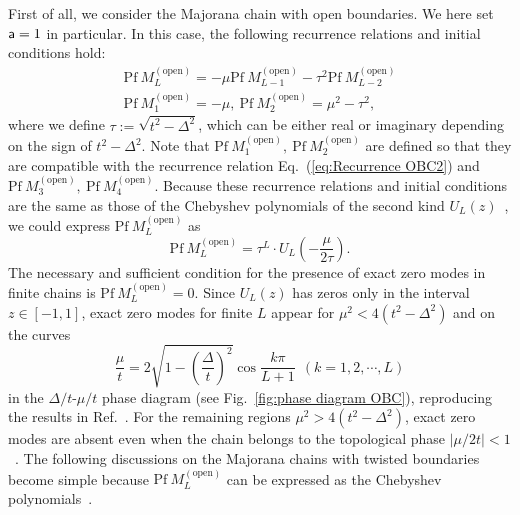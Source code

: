 \documentclass[aps, prb, showpacs, twocolumn, %
amssymb,superscriptaddress]{revtex4}
\begin{document}
First of all, we consider the Majorana chain with open boundaries. We here set ${\sf a}=1$ in particular. In this case, the following recurrence relations and initial conditions hold:
\begin{align}
\mathrm{Pf}~M_{L}^{\left( \mathrm{open} \right)} = -\mu \mathrm{Pf}~M_{L-1}^{\left( \mathrm{open} \right)} - \tau^{2} \mathrm{Pf}~M_{L-2}^{\left( \mathrm{open} \right)}
\label{eq:Recurrence OBC2} \\
\mathrm{Pf}~M_{1} ^{\left( \mathrm{open} \right)} = -\mu,~
\mathrm{Pf}~M_{2} ^{\left( \mathrm{open} \right)} = \mu^{2} - \tau^{2},
\end{align}
where we define $\tau := \sqrt{t^{2} - \Delta^{2}}$, which can be either real or imaginary depending on the sign of $t^2-\Delta^2$. Note that $\mathrm{Pf}~M_{1}^{\left( \mathrm{open} \right)},~\mathrm{Pf}~M_{2}^{\left( \mathrm{open} \right)}$ are defined so that they are compatible with the recurrence relation Eq.~(\ref{eq:Recurrence OBC2}) and $\mathrm{Pf}~M_{3}^{\left( \mathrm{open} \right)} ,~\mathrm{Pf}~M_{4}^{\left( \mathrm{open} \right)} $. 
Because these recurrence relations and initial conditions are the same as those of the Chebyshev polynomials of the second kind $U_{L} \left( z \right)$~\cite{Definition_Chebyshev}, we could express $\mathrm{Pf}~M_{L}^{\left( \mathrm{open} \right)}$ as
\begin{equation}
\mathrm{Pf}~M_{L}^{\left( \mathrm{open} \right)} = \tau^{L} \cdot U_{L} \left( - \frac{\mu}{2 \tau} \right).
\end{equation}
The necessary and sufficient condition for the presence of exact zero modes in finite chains is $\mathrm{Pf}~M_{L}^{\left( \mathrm{open} \right)} = 0$. Since $U_{L} \left( z \right)$ has zeros only in the interval $z \in \left[ -1,1 \right]$, exact zero modes for finite $L$ appear for $\mu^{2} < 4 \left( t^2-\Delta^2 \right)$ and on the curves
\begin{equation}
\frac{\mu}{t} = 2 \sqrt{1 - \left(\frac{\Delta}{t}\right)^{2}} \cos \frac{k \pi}{L+1}~~\left( k = 1,2, \cdots, L \right)
	\label{zero modes, OBC}
\end{equation}
in the $\Delta/t$-$\mu/t$ phase diagram (see Fig.~\ref{fig:phase diagram OBC}), reproducing the results in Ref.~. For the remaining regions $\mu^{2} > 4 \left( t^2-\Delta^2 \right)$, 
exact zero modes are absent even when the chain belongs to the topological phase $\left| \mu/2t \right| < 1$~\cite{Kao-14}. The following discussions on the Majorana chains with twisted boundaries become simple because $\mathrm{Pf}~M_{L}^{\left( \mathrm{open} \right)}$ can be expressed as the Chebyshev polynomials~\cite{Wakatsuki-14}.
\end{document}
